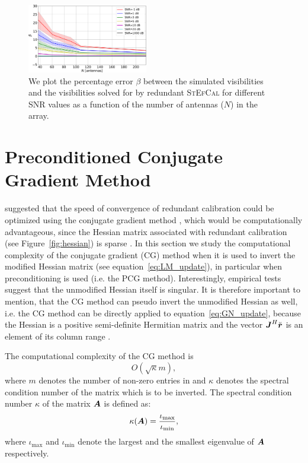 \documentclass[useAMS,usenatbib]{mn2e}
\newcommand{\bA}{\bmath{A}}
\newcommand{\br}{\bmath{r}}
\newcommand{\bJ}{\bmath{J}}
\begin{document}
\begin{figure}
\includegraphics[width=0.47\textwidth]{./prec_error.pdf} 
\caption{We plot the percentage error $\beta$ between the simulated visibilities and the visibilities solved for by redundant \textsc{StEfCal} for different SNR values as a function of the number of antennas ($N$) in the array.}
\label{fig:prec_error}
\end{figure}


\section{Preconditioned Conjugate Gradient Method}
\label{sec:pcg}
\citet{Liu2010} suggested that the speed of convergence of redundant calibration could be optimized using the 
conjugate gradient method \citep{Hestenes1952}, which would be computationally advantageous, since the Hessian matrix associated 
with redundant calibration (see Figure~\ref{fig:hessian}) is sparse \citep{Reid1971}. In this section we study the computational complexity
of the conjugate gradient (CG) method when it is used to invert the modified Hessian matrix (see equation~\ref{eq:LM_update}), 
in particular when preconditioning is used (i.e. the PCG method). Interestingly, empirical tests suggest that the unmodified Hessian itself is singular. It is therefore important to mention, that the CG method 
can pseudo invert the unmodified Hessian as well, i.e. the CG method can be directly applied to equation~\ref{eq:GN_update}, because the Hessian is a positive semi-definite Hermitian matrix and the vector $\bJ^H\breve{\br}$ is an element of its column range \citep{Lu2015}.


The computational complexity of the CG method is  
\begin{equation}
\label{eq:cg_bound}
O(\sqrt{\kappa}m), 
\end{equation}
where $m$ denotes the number of non-zero entries in and $\kappa$ denotes the spectral 
condition number of the matrix which is to be inverted. The spectral condition number $\kappa$ of the matrix $\bA$ is defined as:
\begin{equation}
\label{eq:kappa}
\kappa(\bA) = \frac{\iota_{\textrm{max}}}{\iota_{\textrm{min}}}, 
\end{equation}
where $\iota_{\textrm{max}}$ and $\iota_{\textrm{min}}$ denote the largest and the smallest eigenvalue of $\bA$ respectively.
\end{document}
